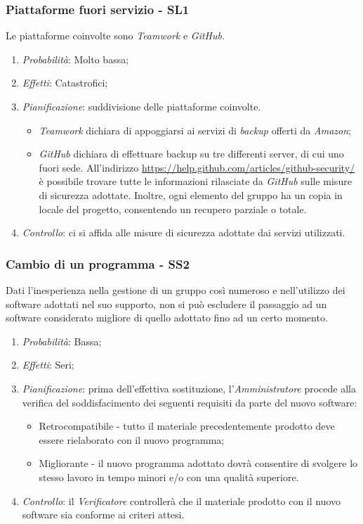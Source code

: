 \subsubsection{Piattaforme fuori servizio - SL1}
Le piattaforme coinvolte sono \textit{Teamwork} e \textit{GitHub}.
\begin{enumerate}
\item \textit{Probabilit\`a}: Molto bassa;
\item \textit{Effetti}: Catastrofici;
\item \textit{Pianificazione}: suddivisione delle piattaforme coinvolte.
  \begin{itemize}
    \item \textit{Teamwork} dichiara di appoggiarsi ai servizi di \textit{backup} offerti da \textit{Amazon};
    \item \textit{GitHub} dichiara di effettuare backup su tre differenti server, di cui uno fuori sede. All'indirizzo \href{https://help.github.com/articles/github-security/}{https://help.github.com/articles/github-security/} \`e possibile trovare tutte le informazioni rilasciate da \textit{GitHub} sulle misure di sicurezza adottate. Inoltre, ogni elemento del gruppo ha un copia in locale del progetto, consentendo un recupero parziale o totale.
  \end{itemize}
\item \textit{Controllo}: ci si affida alle misure di sicurezza adottate dai servizi utilizzati.
\end{enumerate}

\subsubsection{Cambio di un programma - SS2}
Dati l'inesperienza nella gestione di un gruppo cos\`i numeroso e nell'utilizzo dei software adottati nel suo supporto, non si pu\`o escludere il passaggio ad un software considerato migliore di quello adottato fino ad un certo momento.
\begin{enumerate}
\item \textit{Probabilit\`a}: Bassa;
\item \textit{Effetti}: Seri;
\item \textit{Pianificazione}: prima dell'effettiva sostituzione, l'\textit{Amministratore} procede alla verifica del soddisfacimento dei seguenti requisiti da parte del nuovo software:
  \begin{itemize}
    \item Retrocompatibile - tutto il materiale precedentemente prodotto deve essere rielaborato con il nuovo programma;
    \item Migliorante - il nuovo programma adottato dovr\`a consentire di svolgere lo stesso lavoro in tempo minori e/o con una qualit\`a superiore.
  \end{itemize}
\item \textit{Controllo}: il \textit{Verificatore} controller\`a che il materiale prodotto con il nuovo software sia conforme ai criteri attesi.
\end{enumerate}

